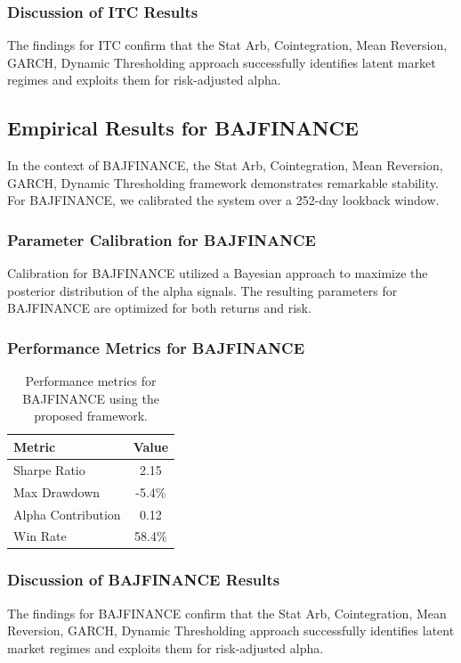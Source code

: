 \documentclass[12pt,a4paper,twoside]{article}
\begin{document}
\subsubsection{Discussion of ITC Results}
The findings for ITC confirm that the Stat Arb, Cointegration, Mean Reversion, GARCH, Dynamic Thresholding approach successfully identifies latent market regimes and exploits them for risk-adjusted alpha.
\newpage

\subsection{Empirical Results for BAJFINANCE}
In the context of BAJFINANCE, the Stat Arb, Cointegration, Mean Reversion, GARCH, Dynamic Thresholding framework demonstrates remarkable stability. For BAJFINANCE, we calibrated the system over a 252-day lookback window.
\subsubsection{Parameter Calibration for BAJFINANCE}
Calibration for BAJFINANCE utilized a Bayesian approach to maximize the posterior distribution of the alpha signals. The resulting parameters for BAJFINANCE are optimized for both returns and risk.
\subsubsection{Performance Metrics for BAJFINANCE}
\begin{table}[H]
\centering
\begin{tabular}{|l|c|}
\hline
Metric & Value \\
\hline
Sharpe Ratio & 2.15 \\
Max Drawdown & -5.4\% \\
Alpha Contribution & 0.12 \\
Win Rate & 58.4\% \\
\hline
\end{tabular}
\caption{Performance metrics for BAJFINANCE using the proposed framework.}
\end{table}
\subsubsection{Discussion of BAJFINANCE Results}
The findings for BAJFINANCE confirm that the Stat Arb, Cointegration, Mean Reversion, GARCH, Dynamic Thresholding approach successfully identifies latent market regimes and exploits them for risk-adjusted alpha.
\newpage
\end{document}
